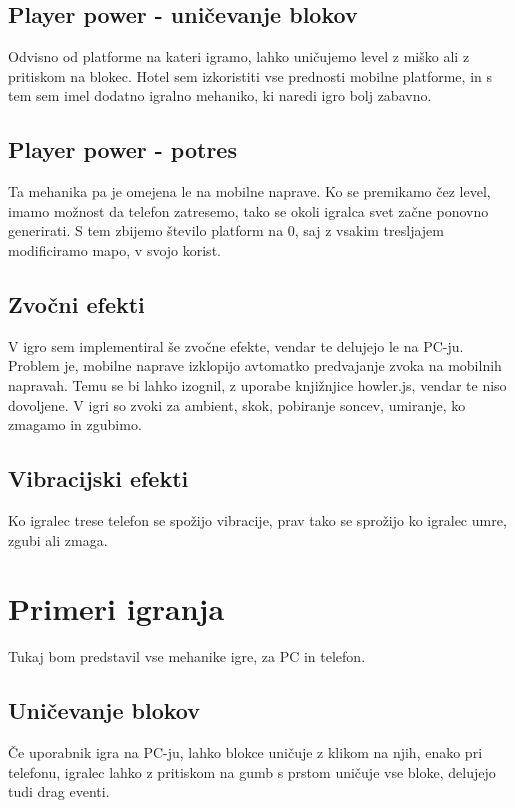 \documentclass[a4paper,11pt]{article}
\begin{document}
\subsection{Player power - uničevanje blokov}

Odvisno od platforme na kateri igramo, lahko uničujemo level z miško ali z pritiskom na blokec. Hotel sem izkoristiti vse prednosti mobilne platforme, in s tem sem imel dodatno igralno mehaniko, ki naredi igro bolj zabavno.

\subsection{Player power - potres}

Ta mehanika pa je omejena le na mobilne naprave. Ko se premikamo čez level, imamo možnost da telefon zatresemo, tako se okoli igralca svet začne ponovno generirati. S tem zbijemo število platform na 0, saj z vsakim tresljajem modificiramo mapo, v svojo korist.

\subsection{Zvočni efekti}

V igro sem implementiral še zvočne efekte, vendar te delujejo le na PC-ju. Problem je, mobilne naprave izklopijo avtomatko predvajanje zvoka na mobilnih napravah. Temu se bi lahko izognil, z uporabe knjižnjice howler.js, vendar te niso dovoljene. V igri so zvoki za ambient, skok, pobiranje soncev, umiranje, ko zmagamo in zgubimo.

\subsection{Vibracijski efekti}

Ko igralec trese telefon se spožijo vibracije, prav tako se sprožijo ko igralec umre, zgubi ali zmaga.

\section{Primeri igranja}

Tukaj bom predstavil vse mehanike igre, za PC in telefon.

\subsection{Uničevanje blokov}
Če uporabnik igra na PC-ju, lahko blokce uničuje z klikom na njih, enako pri telefonu, igralec lahko z pritiskom na gumb s prstom uničuje vse bloke, delujejo tudi drag eventi.
\end{document}
